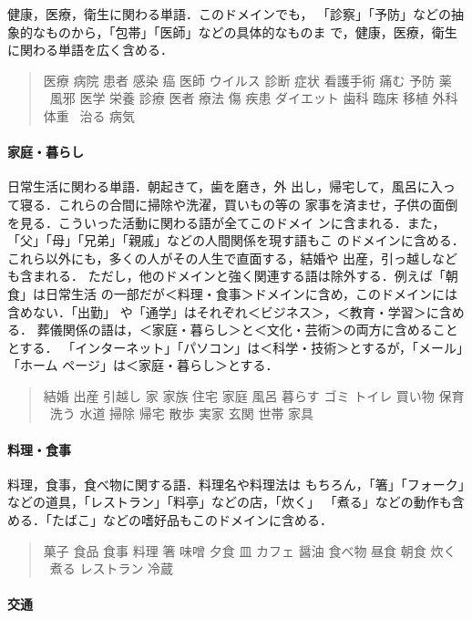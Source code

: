 \documentclass[a4j,titlepage]{jarticle}
\begin{document}
健康，医療，衛生に関わる単語．このドメインでも，
「診察」「予防」などの抽象的なものから，「包帯」「医師」などの具体的なものま
で，健康，医療，衛生に関わる単語を広く含める．

\begin{quote}
医療 病院 患者 感染 癌 医師 ウイルス 診断 症状 看護手術 痛む 予防 薬 
\ 風邪 医学 栄養 診療 医者 療法 傷 疾患 ダイエット 歯科 臨床 移植 外科 体重 
\ 治る 病気
\end{quote}


\paragraph{家庭・暮らし}

日常生活に関わる単語．朝起きて，歯を磨き，外
出し，帰宅して，風呂に入って寝る．これらの合間に掃除や洗濯，買いもの等の
家事を済ませ，子供の面倒を見る．こういった活動に関わる語が全てこのドメイ
ンに含まれる．また，「父」「母」「兄弟」「親戚」などの人間関係を現す語もこ
のドメインに含める．これら以外にも，多くの人がその人生で直面する，結婚や
出産，引っ越しなども含まれる．
ただし，他のドメインと強く関連する語は除外する．例えば「朝食」は日常生活
の一部だが＜料理・食事＞ドメインに含め，このドメインには含めない．「出勤」
や「通学」はそれぞれ＜ビジネス＞，＜教育・学習＞に含める．
葬儀関係の語は，＜家庭・暮らし＞と＜文化・芸術＞の両方に含めることとする．
「インターネット」「パソコン」は＜科学・技術＞とするが，「メール」「ホーム
ページ」は＜家庭・暮らし＞とする．

\begin{quote}
結婚 出産 引越し 家 家族 住宅 家庭 風呂 暮らす ゴミ トイレ 買い物 保育 
\ 洗う 水道 掃除 帰宅 散歩 実家 玄関 世帯 家具
\end{quote}


\paragraph{料理・食事}

料理，食事，食べ物に関する語．料理名や料理法は
もちろん，「箸」「フォーク」などの道具，「レストラン」「料亭」などの店，「炊く」
「煮る」などの動作も含める．「たばこ」などの嗜好品もこのドメインに含める．

\begin{quote}
菓子 食品 食事 料理 箸 味噌 夕食 皿 カフェ 醤油 食べ物 昼食 朝食 炊く 
\ 煮る レストラン 冷蔵
\end{quote}


\paragraph{交通}
\end{document}
